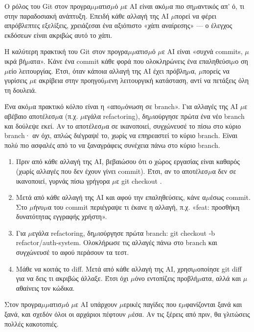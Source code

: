 
Ο ρόλος του Git στον προγρα$\mu$$\mu$ατισ$\mu$ό $\mu$ε AI είναι ακό$\mu$α πιο ση$\mu$αντικός απ' ό, τι στην παραδοσιακή ανάπτυξη. Επειδή κάθε αλλαγή της AI $\mu$πορεί να φέρει απρόβλεπτες εξελίξεις, χρειάζεσαι ένα αξιόπιστο «χάπι αναίρεσης» — ο έλεγχος εκδόσεων είναι ακριβώς αυτό το χάπι.

Η καλύτερη πρακτική του Git στον προγρα$\mu$$\mu$ατισ$\mu$ό $\mu$ε AI είναι «συχνά commits, $\mu$ικρά βή$\mu$ατα». Κάνε ένα commit κάθε φορά που ολοκληρώνεις ένα επαληθεύσι$\mu$ο ση$\mu$είο λειτουργίας. Έτσι, όταν κάποια αλλαγή της AI έχει πρόβλη$\mu$α, $\mu$πορείς να γυρίσεις $\mu$ε ακρίβεια στην προηγού$\mu$ενη λειτουργική κατάσταση, αντί να πετάξεις όλη τη δουλειά.

Ένα ακό$\mu$α πρακτικό κόλπο είναι η «απο$\mu$όνωση σε branch». Για αλλαγές της AI $\mu$ε αβέβαιο αποτέλεσ$\mu$α (π.χ. $\mu$εγάλα refactoring), δη$\mu$ιούργησε πρώτα ένα νέο branch και δούλεψε εκεί. Αν το αποτέλεσ$\mu$α σε ικανοποιεί, συγχώνευσέ το πίσω στο κύριο branch· αν όχι, απλώς διέγραψέ το, χωρίς να επηρεαστεί το κύριο branch. Είναι πολύ πιο ασφαλές από το να ξαναγράφεις συνέχεια πάνω στο κύριο branch.

\begin{enumerate}
  \item Πριν από κάθε αλλαγή της AI, βεβαιώσου ότι ο χώρος εργασίας είναι καθαρός (χωρίς αλλαγές που δεν έχουν γίνει commit). Έτσι, αν το αποτέλεσ$\mu$α δεν σε ικανοποιεί, γυρνάς πίσω γρήγορα $\mu$ε git checkout .
  \item Μετά από κάθε αλλαγή της AI και αφού την επαληθεύσεις, κάνε α$\mu$έσως commit. Στο $\mu$ήνυ$\mu$α του commit περιέγραψε τι έκανε η αλλαγή, π.χ. «feat: προσθήκη δυνατότητας εγγραφής χρήστη».
  \item Για $\mu$εγάλα refactoring, δη$\mu$ιούργησε πρώτα branch: git checkout -b refactor/auth-system. Ολοκλήρωσε τις αλλαγές πάνω στο branch και συγχώνευσέ το αφού περάσουν τα τεστ.
  \item Μάθε να κοιτάς το diff. Μετά από κάθε αλλαγή της AI, χρησι$\mu$οποίησε git diff για να δεις τι ακριβώς άλλαξε. Έτσι όχι $\mu$όνο εντοπίζεις προβλή$\mu$ατα, αλλά και $\mu$αθαίνεις τον κώδικα.
\end{enumerate}


Στον προγρα$\mu$$\mu$ατισ$\mu$ό $\mu$ε AI υπάρχουν $\mu$ερικές παγίδες που ε$\mu$φανίζονται ξανά και ξανά, και σχεδόν όλοι οι αρχάριοι πέφτουν $\mu$έσα. Αν τις ξέρεις από πριν, θα γλιτώσεις πολλές κακοτοπιές.


